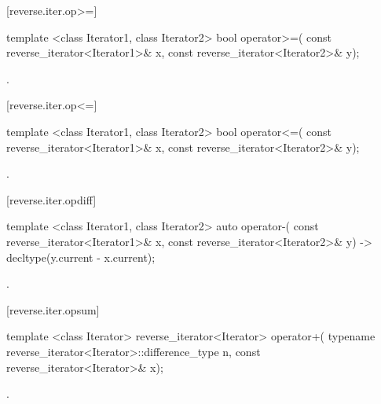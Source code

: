 [reverse.iter.op>=]{}

%
\begin{itemdecl}
template <class Iterator1, class Iterator2>
  bool operator>=(
    const reverse_iterator<Iterator1>& x,
    const reverse_iterator<Iterator2>& y);
\end{itemdecl}

\begin{itemdescr}
\pnum
\returns
{}.
\end{itemdescr}

[reverse.iter.op<=]{}

%
\begin{itemdecl}
template <class Iterator1, class Iterator2>
  bool operator<=(
    const reverse_iterator<Iterator1>& x,
    const reverse_iterator<Iterator2>& y);
\end{itemdecl}

\begin{itemdescr}
\pnum
\returns
{}.
\end{itemdescr}

[reverse.iter.opdiff]{}

%
\begin{itemdecl}
template <class Iterator1, class Iterator2>
    auto operator-(
    const reverse_iterator<Iterator1>& x,
    const reverse_iterator<Iterator2>& y) -> decltype(y.current - x.current);
\end{itemdecl}

\begin{itemdescr}
\pnum
\returns
{}.
\end{itemdescr}

[reverse.iter.opsum]{}

%
\begin{itemdecl}
template <class Iterator>
  reverse_iterator<Iterator> operator+(
    typename reverse_iterator<Iterator>::difference_type n,
    const reverse_iterator<Iterator>& x);
\end{itemdecl}

\begin{itemdescr}
\pnum
\returns
{}.
\end{itemdescr}

